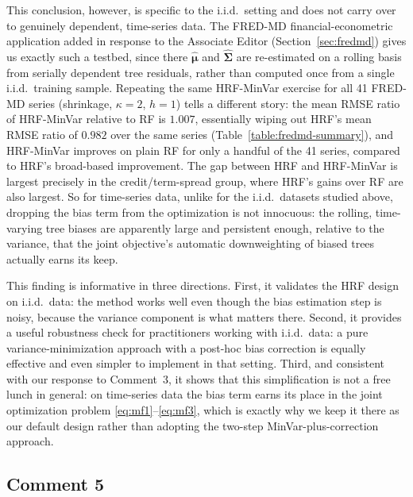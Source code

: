 \documentclass[12pt]{article}
\begin{document}
This conclusion, however, is specific to the i.i.d.\ setting and does not
carry over to genuinely dependent, time-series data. The FRED-MD
financial-econometric application added in response to the Associate
Editor (Section~\ref{sec:fredmd}) gives us exactly such a testbed, since
there $\hat{\boldsymbol\mu}$ and $\hat{\boldsymbol\Sigma}$ are re-estimated
on a rolling basis from serially dependent tree residuals, rather than
computed once from a single i.i.d.\ training sample. Repeating the same
HRF-MinVar exercise for all 41 FRED-MD series (shrinkage, $\kappa = 2$,
$h = 1$) tells a different story: the mean RMSE ratio of HRF-MinVar
relative to RF is $1.007$, essentially wiping out HRF's mean RMSE ratio of
$0.982$ over the same series (Table~\ref{table:fredmd-summary}), and
HRF-MinVar improves on plain RF for only a handful of the 41 series,
compared to HRF's broad-based improvement. The gap between HRF and
HRF-MinVar is largest precisely in the credit/term-spread group, where
HRF's gains over RF are also largest. So for time-series data, unlike for
the i.i.d.\ datasets studied above, dropping the bias term from the
optimization is not innocuous: the rolling, time-varying tree biases are
apparently large and persistent enough, relative to the variance, that the
joint objective's automatic downweighting of biased trees actually earns
its keep.

This finding is informative in three directions.
First, it validates the HRF design on i.i.d.\ data: the method works well
even though the bias estimation step is noisy, because the variance
component is what matters there.
Second, it provides a useful robustness check for practitioners working
with i.i.d.\ data: a pure variance-minimization approach with a post-hoc
bias correction is equally effective and even simpler to implement in that
setting.
Third, and consistent with our response to Comment~3, it shows that this
simplification is not a free lunch in general: on time-series data the
bias term earns its place in the joint optimization problem
\eqref{eq:mf1}--\eqref{eq:mf3}, which is exactly why we keep it there as
our default design rather than adopting the two-step MinVar-plus-correction
approach.

\subsection*{Comment 5}
\end{document}

